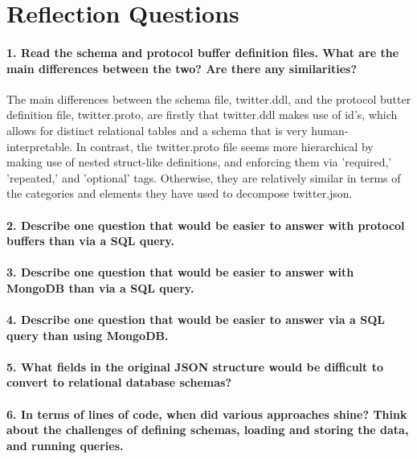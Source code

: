 \documentclass[12pt]{article}
\let\oldsection\section
\renewcommand\section{\clearpage\oldsection}
\begin{document}


\section*{Reflection Questions}

\paragraph{1. Read the schema and protocol buffer definition files. What are the main differences between the two? Are there any similarities?}

The main differences between the schema file, twitter.ddl, and the protocol butter definition file, twitter.proto, are firstly that twitter.ddl makes use of id's, which allows for distinct relational tables and a schema that is very human-interpretable. In contrast, the twitter.proto file seems more hierarchical by making use of nested struct-like definitions, and enforcing them via 'required,' 'repeated,' and 'optional' tags. Otherwise, they are relatively similar in terms of the categories and elements they have used to decompose twitter.json.

\paragraph{2. Describe one question that would be easier to answer with protocol buffers than via a SQL query.}


\paragraph{3. Describe one question that would be easier to answer with MongoDB than via a SQL query.}


\paragraph{4. Describe one question that would be easier to answer via a SQL query than using MongoDB.}


\paragraph{5. What fields in the original JSON structure would be difficult to convert to relational database schemas?}


\paragraph{6. In terms of lines of code, when did various approaches shine? Think about the challenges of defining schemas, loading and storing the data, and running queries.}
\end{document}
